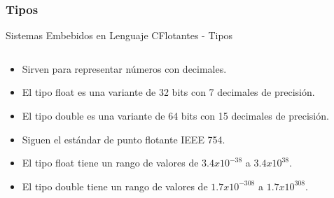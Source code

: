 \documentclass[aspectratio=169, xcolor=dvipsnames]{beamer}
\begin{document}
\subsubsection{Tipos}
\begin{frame}{Sistemas Embebidos en Lenguaje C}{Flotantes - Tipos}
\begin{columns}
    \begin{column}{0.5\textwidth}
        \begin{itemize}
            \item Sirven para representar números con decimales.
            \item El tipo \textcolor{myblue}{float} es una variante de 32 bits con 7 decimales de precisión.
            \item El tipo \textcolor{myblue}{double} es una variante de 64 bits con 15 decimales de precisión.
            \item Siguen el estándar de punto flotante IEEE 754.
            \item El tipo \textcolor{myblue}{float} tiene un rango de valores de $3.4 x 10^{-38}$ a $3.4 x 10^{38}$.
            \item El tipo \textcolor{myblue}{double} tiene un rango de valores de $1.7 x 10^{-308}$ a $1.7 x 10^{308}$.
        \end{itemize}
    \end{column}
    \begin{column}{0.5\textwidth}
        
    \end{column}
\end{columns}
\end{frame}
\end{document}
